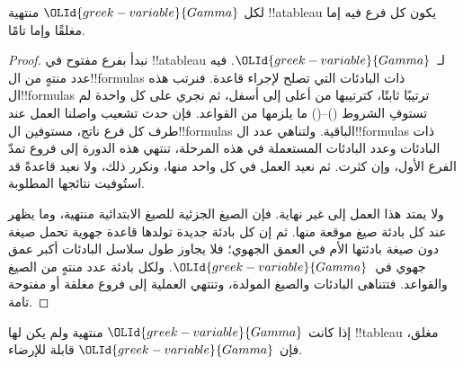 \documentclass[../../../include/open-logic-section]{subfiles}
\begin{document}
\begin{prop}
  لكل $\OLId{greek-variable}{Gamma}$ منتهية !!a{tableau} يكون كل فرع فيه إما مغلقًا وإما تامًا.
\end{prop}

\begin{proof}
  نبدأ بفرع مفتوح في !!a{tableau} لـ~$\OLId{greek-variable}{Gamma}$.
  فيه عدد منتهٍ من ال!!{formula}s ذات البادئات التي تصلح لإجراء
  قاعدة. فنرتب هذه ال!!{formula}s ترتيبًا ثابتًا، كترتيبها من أعلى
  إلى أسفل، ثم نجري على كل واحدة لم تستوفِ الشروط ()--() ما
  يلزمها من القواعد. فإن حدث تشعيب واصلنا العمل عند طرف كل فرع
  ناتج، مستوفين ال!!{formula}s الباقية. ولتناهي عدد ال!!{formula}s
  ذات البادئات وعدد البادئات المستعملة في هذه المرحلة، تنتهي هذه
  الدورة إلى فروع تمدّ الفرع الأول، وإن كثرت. ثم نعيد العمل في كل
  واحد منها، ونكرر ذلك، ولا نعيد قاعدةً قد استُوفيت نتائجها المطلوبة.

  ولا يمتد هذا العمل إلى غير نهاية. فإن الصيغ الجزئية للصيغ الابتدائية
  منتهية، وما يظهر عند كل بادئة صيغ موقعة منها. ثم إن كل بادئة جديدة
  تولدها قاعدة جهوية تحمل صيغة دون صيغة بادئتها الأم في العمق الجهوي؛
  فلا يجاوز طول سلاسل البادئات أكبر عمق جهوي في~$\OLId{greek-variable}{Gamma}$. ولكل بادئة
  عدد منتهٍ من الصيغ والقواعد. فتتناهى البادئات والصيغ المولدة، وتنتهي
  العملية إلى فروع مغلقة أو مفتوحة تامة.
\end{proof}

\begin{thm}[التمام]
  إذا كانت $\OLId{greek-variable}{Gamma}$ منتهية ولم يكن لها !!{tableau} مغلق، فإن $\OLId{greek-variable}{Gamma}$
  قابلة للإرضاء.
\end{thm}
\end{document}
